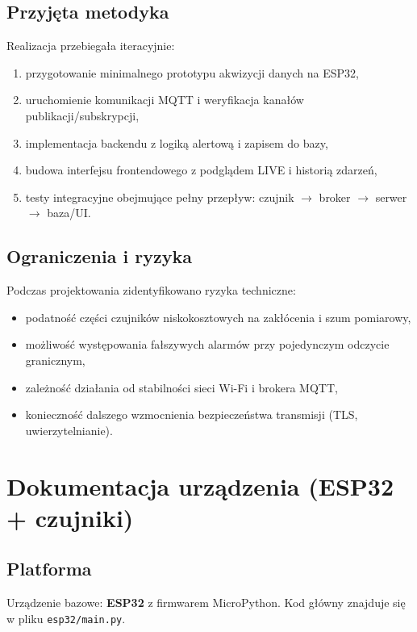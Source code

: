 \documentclass[a4paper,12pt]{article}
\begin{document}
\subsection{Przyjęta metodyka}
Realizacja przebiegała iteracyjnie:
\begin{enumerate}
  \item przygotowanie minimalnego prototypu akwizycji danych na ESP32,
  \item uruchomienie komunikacji MQTT i weryfikacja kanałów publikacji/subskrypcji,
  \item implementacja backendu z logiką alertową i zapisem do bazy,
  \item budowa interfejsu frontendowego z podglądem LIVE i historią zdarzeń,
  \item testy integracyjne obejmujące pełny przepływ: czujnik $\rightarrow$ broker $\rightarrow$ serwer $\rightarrow$ baza/UI.
\end{enumerate}

\subsection{Ograniczenia i ryzyka}
Podczas projektowania zidentyfikowano ryzyka techniczne:
\begin{itemize}
  \item podatność części czujników niskokosztowych na zakłócenia i szum pomiarowy,
  \item możliwość występowania fałszywych alarmów przy pojedynczym odczycie granicznym,
  \item zależność działania od stabilności sieci Wi-Fi i brokera MQTT,
  \item konieczność dalszego wzmocnienia bezpieczeństwa transmisji (TLS, uwierzytelnianie).
\end{itemize}

\section{Dokumentacja urządzenia (ESP32 + czujniki)}
\subsection{Platforma}
Urządzenie bazowe: \textbf{ESP32} z firmwarem MicroPython. Kod główny znajduje się w pliku \texttt{esp32/main.py}.
\end{document}
